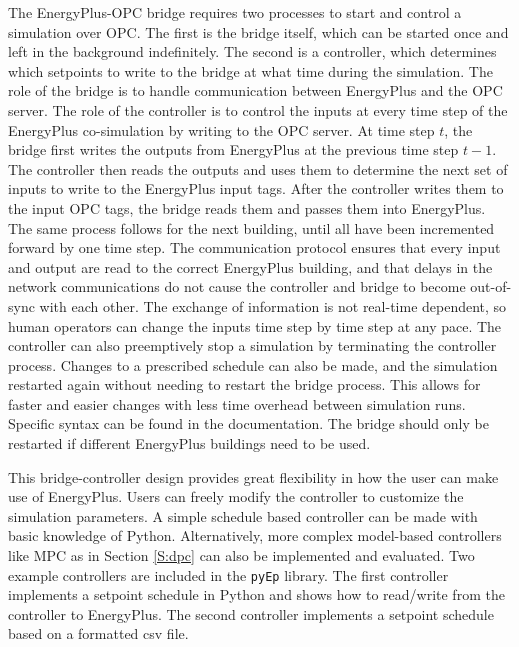 The EnergyPlus-OPC bridge requires two processes to start and control a simulation over OPC. 
The first is the bridge itself, which can be started once and left in the background indefinitely. 
The second is a controller, which determines which setpoints to write to the bridge at what time during the simulation. 
The role of the bridge is to handle communication between EnergyPlus and the OPC server. 
The role of the controller is to control the inputs at every time step of the EnergyPlus co-simulation by writing to the OPC server.
At time step $t$, the bridge first writes the outputs from EnergyPlus at the previous time step $t-1$. 
The controller then reads the outputs and uses them to determine the next set of inputs to write to the EnergyPlus input tags. 
After the controller writes them to the input OPC tags, the bridge reads them and passes them into EnergyPlus. 
The same process follows for the next building, until all have been incremented forward by one time step.
The communication protocol ensures that every input and output are read to the correct EnergyPlus building, and that delays in the network communications do not cause the controller and bridge to become out-of-sync with each other. 
The exchange of information is not real-time dependent, so human operators can change the inputs time step by time step at any pace. 
The controller can also preemptively stop a simulation by terminating the controller process. 
Changes to a prescribed schedule can also be made, and the simulation restarted again without needing to restart the bridge process. 
This allows for faster and easier changes with less time overhead between simulation runs.
Specific syntax can be found in the documentation. 
The bridge should only be restarted if different EnergyPlus buildings need to be used.

This bridge-controller design provides great flexibility in how the user can make use of EnergyPlus. 
Users can freely modify the controller to customize the simulation parameters. 
A simple schedule based controller can be made with basic knowledge of Python. 
Alternatively, more complex model-based controllers like MPC as in Section \ref{S:dpc} can also be implemented and evaluated.
Two example controllers are included in the \texttt{pyEp} library. 
The first controller implements a setpoint schedule in Python and shows how to read/write from the controller to EnergyPlus. 
The second controller implements a setpoint schedule based on a formatted csv file. 

